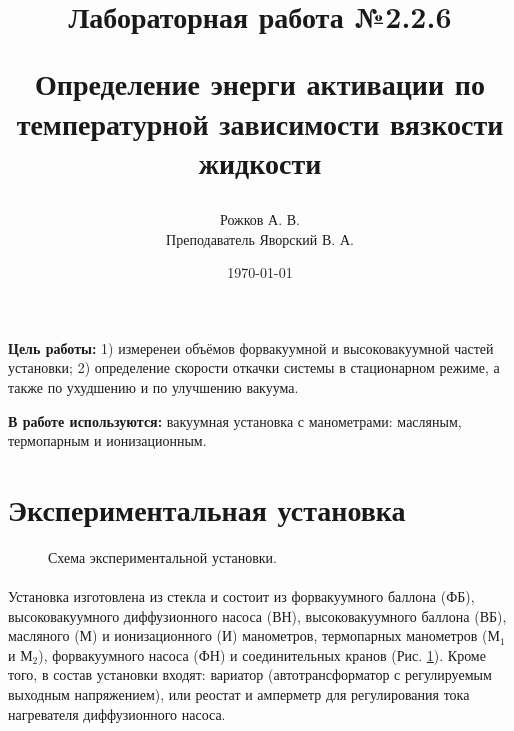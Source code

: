 \documentclass[a4paper, 12pt]{article}
\title{\begin{center}Лабораторная работа №2.2.6\end{center}
Определение энерги активации по температурной зависимости вязкости жидкости}
\author{Рожков А. В. \\ Преподаватель Яворский В. А.}
\date{\today}
\begin{document}
    \maketitle
    \newpage

    \textbf{Цель работы:} 1) измеренеи объёмов форвакуумной и высоковакуумной частей установки; 2) определение скорости откачки системы в стационарном режиме, а также по ухудшению и по улучшению вакуума.

    \textbf{В работе используются:} вакуумная установка с манометрами: масляным, термопарным и ионизационным.

    \section{Экспериментальная установка}

    \begin{figure}[h]
        \caption{Схема экспериментальной установки.}
        \label{ris:ustanovka}
    \end{figure}

    \paragraph{}
    Установка изготовлена из стекла и состоит из форвакуумного баллона (ФБ), высоковакуумного диффузионного насоса (ВН), высоковакуумного баллона (ВБ), масляного (М) и ионизационного (И) манометров, термопарных манометров ($М_1$ и $М_2$), форвакуумного насоса (ФН) и соединительных кранов (Рис. \ref{ris:ustanovka}). Кроме того, в состав установки входят: вариатор (автотрансформатор с регулируемым выходным напряжением), или реостат и амперметр для регулирования тока нагревателя диффузионного насоса.
\end{document}
